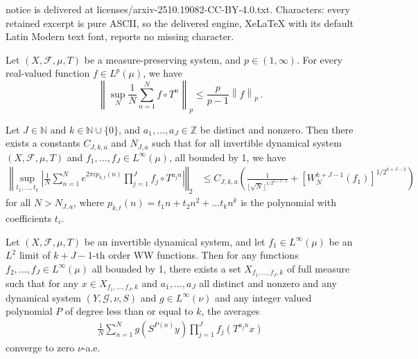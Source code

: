 \documentclass[10pt,a4paper]{amsart}
\newcommand{\N}{\mathbb{N}}
\newcommand{\floor}[1]{\lfloor#1\rfloor}
\newcommand{\norm}[1]{\left\lVert#1\right\rVert}
\begin{document}
notice is delivered at licenses/arxiv-2510.19082-CC-BY-4.0.txt. Characters: every retained excerpt is pure ASCII, so the delivered engine, XeLaTeX with its default Latin Modern text font, reports no missing character.
\begin{lemma}\label{L:maxIneq}
Let $(X, \mathcal{F}, \mu, T)$ be a measure-preserving system, and $p \in (1, \infty)$. For every real-valued function $f \in L^p(\mu)$, we have
\[ \norm{  \sup_N \frac{1}{N} \sum_{n=1}^N f \circ T^n}_p \leq \frac{p}{p-1} \norm{f}_p \, . \]
\end{lemma}

\begin{theorem} \label{T:polynomial WW estimate}
Let $J \in \N$ and $k\in \N \cup \{0\}$, and $a_1, \dots, a_J\in \mathbb{Z}$ be distinct and nonzero. Then there exists a constants $C_{J, k, a}$ and $N_{J, a}$ such that for all invertible dynamical system $(X, \mathcal{F}, \mu, T)$ and $f_1, \dots, f_J\in L^\infty (\mu)$, all bounded by 1, we have
\begin{align}\label{E:poly bound}
\left\Vert \sup_{t_1, \dots, t_k} \left|\frac{1}{N}\sum_{n=1}^N e^{2\pi i p_{k, t}(n)} \prod_{j=1}^J f_j \circ T^{a_j n} \right| \right\Vert_2 &\leq C_{J, k, a}\left(\frac{1}{\floor{\sqrt{N}}^{1/2^{k+J-2}}} + \left[W_N^{k+J-1}(f_1)\right]^{1/2^{k+J-2}}\right)
\end{align}
for all $N> N_{J, a}$, where $p_{k, t}(n) = t_1 n + t_2n^2 + \dots t_kn^k$ is the polynomial with coefficients $t_i$.
\end{theorem}

\begin{theorem}\label{T:polynomial return times}
Let $(X, \mathcal{F}, \mu, T)$ be an invertible dynamical system, and let $f_1 \in L^\infty(\mu)$ be an $L^2$ limit of $k+J-1$-th order WW functions. Then for any functions $f_2, \dots, f_J\in L^\infty(\mu)$ all bounded by 1, there exists a set $X_{f_1, \dots, f_J, k}$ of full measure such that for any $x\in X_{f_1, \dots, f_J, k}$ and $a_1, \dots, a_J$ all distinct and nonzero and any dynamical system $(Y, \mathcal{G},\nu, S)$ and $g\in L^\infty(\nu)$ and any integer valued polynomial $P$ of degree less than or equal to $k$, the averages
\begin{align*}
\frac{1}{N}\sum_{n=1}^N g(S^{P(n)} y) \prod_{j=1}^J f_{j}(T^{a_j n} x)
\end{align*}
converge to zero $\nu$-a.e.
\end{theorem}
\end{document}
